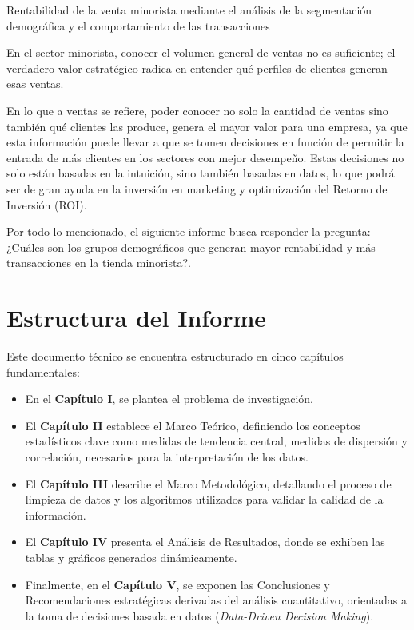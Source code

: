 \documentclass[oneside,11pt]{Latex/Classes/PhDthesisPSnPDF}
\begin{document}
Rentabilidad de la venta minorista mediante el análisis de la
segmentación demográfica y el comportamiento de las transacciones

En el sector minorista, conocer el volumen general de ventas no es
suficiente; el verdadero valor estratégico radica en entender qué
perfiles de clientes generan esas ventas.

En lo que a ventas se refiere, poder conocer no solo la cantidad de
ventas sino también qué clientes las produce, genera el mayor valor para
una empresa, ya que esta información puede llevar a que se tomen
decisiones en función de permitir la entrada de más clientes en los
sectores con mejor desempeño. Estas decisiones no solo están basadas en
la intuición, sino también basadas en datos, lo que podrá ser de gran
ayuda en la inversión en marketing y optimización del Retorno de
Inversión (ROI).

Por todo lo mencionado, el siguiente informe busca responder la
pregunta: ¿Cuáles son los grupos demográficos que generan mayor
rentabilidad y más transacciones en la tienda minorista?.

\section*{Estructura del Informe}

Este documento técnico se encuentra estructurado en cinco capítulos
fundamentales:

\begin{itemize}
    \item En el \textbf{Capítulo I}, se plantea el problema de investigación.
    
    \item El \textbf{Capítulo II} establece el Marco Teórico, definiendo los conceptos estadísticos clave como medidas de tendencia central, medidas de dispersión y correlación, necesarios para la interpretación de los datos.
    
    \item El \textbf{Capítulo III} describe el Marco Metodológico, detallando el proceso de limpieza de datos y los algoritmos utilizados para validar la calidad de la información.
    
    \item El \textbf{Capítulo IV} presenta el Análisis de Resultados, donde se exhiben las tablas y gráficos generados dinámicamente.
    
    \item Finalmente, en el \textbf{Capítulo V}, se exponen las Conclusiones y Recomendaciones estratégicas derivadas del análisis cuantitativo, orientadas a la toma de decisiones basada en datos (\textit{Data-Driven Decision Making}).
\end{itemize}
\end{document}
